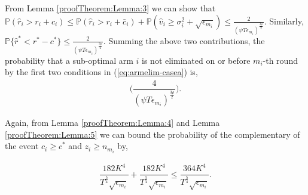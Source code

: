 \begin{customproof}{1}
  

From Lemma \ref{proofTheorem:Lemma:3} we can show that $\mathbb{P}(\hat{r}_{i}> r_{i} + c_{i})\leq\mathbb{P}\left( \hat{r}_{i} > r_{i}+ \bar{c}_i\right) + \mathbb{P}\left( \hat{v}_{i}\geq \sigma_{i}^{2}+\sqrt{\epsilon_{m_{i}}}\right) \leq \frac{2}{(\psi  T\epsilon_{m_{i}})^{\frac{3\rho}{2}}}$. Similarly, $\mathbb{P}\lbrace\hat{r}^{*} < r^{*} - c^{*}\rbrace \leq \frac{2}{(\psi  T\epsilon_{m_{i}})^{\frac{3\rho}{2}}}$. Summing the above two contributions, the probability that a sub-optimal arm ${i}$ is not eliminated on or before $m_{i}$-th round by the first two conditions in  (\ref{eq:armelim-casea}) is,  
\begin{eqnarray}
\bigg(\dfrac{4}{(\psi T\epsilon_{m_{i}})^{\frac{3\rho}{2}}} \bigg). \label{eq:arm:elim:c1}
\end{eqnarray}
 

Again, from Lemma \ref{proofTheorem:Lemma:4} and Lemma \ref{proofTheorem:Lemma:5} we can bound the probability of the  complementary of the event $c_{i} \geq c^* $ and $ z_i \geq n_{m_i}$ by,

\begin{eqnarray}
\dfrac{182 K^4}{T^{\frac{5}{4}}\sqrt{\epsilon_{m_i}}} + \dfrac{182 K^4}{T^{\frac{5}{4}}\sqrt{\epsilon_{m_i}}}\leq \dfrac{364 K^4}{T^{\frac{5}{4}}\sqrt{\epsilon_{m_i}}}. \label{eq:arm:elim:c2}
\end{eqnarray}


\end{customproof}
